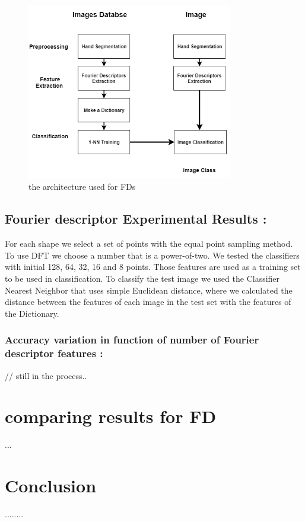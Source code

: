 \begin{figure}[H]
\centering
\includegraphics[width=0.8\textwidth]{img/latex.png}
\caption{the architecture used for FDs}
\label{fig:dft}
\end{figure}




\subsection{Fourier descriptor Experimental Results :}

For each shape we select a set of points with the equal point
sampling method. To use DFT we choose a number that is a
power-of-two. We tested the classifiers with initial 128, 64, 32, 16
and 8 points. Those features are used as a training set to be
used in classification. To classify the test image we used the Classifier Nearest Neighbor that uses simple  Euclidean distance, where we calculated the distance between the features of each image in
the test set with the features of the Dictionary.


\subsubsection{Accuracy variation in function of number of Fourier descriptor features : }


// still in the process..


\section{comparing results for FD}




...



\section{Conclusion}


........